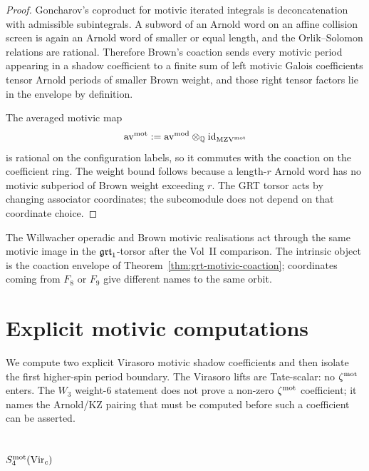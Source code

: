 \begin{proof}
Goncharov's coproduct for motivic iterated integrals is deconcatenation
with admissible subintegrals. A subword of an Arnold word on an affine
collision screen is again an Arnold word of smaller or equal length,
and the Orlik--Solomon relations are rational. Therefore Brown's
coaction sends every motivic period appearing in a shadow coefficient
to a finite sum of left motivic Galois coefficients tensor Arnold
periods of smaller Brown weight, and those right tensor factors lie in
the envelope by definition.

The averaged motivic map
\[
 \mathrm{av}^{\mathrm{mot}}:=\mathrm{av}^{\mathrm{mod}}\otimes_{\mathbb Q}
 \mathrm{id}_{\mathrm{MZV}^{\mathrm{mot}}}
\]
is rational on the configuration labels, so it commutes with the
coaction on the coefficient ring. The weight bound follows because a
length-$r$ Arnold word has no motivic subperiod of Brown weight
exceeding $r$. The GRT torsor acts by changing associator coordinates;
the subcomodule does not depend on that coordinate choice.
\end{proof}

\begin{remark}
The Willwacher operadic and Brown motivic realisations act through the
same motivic image in the $\mathfrak{grt}_1$-torsor after the Vol~II comparison.
The intrinsic object is the coaction envelope of
Theorem~\ref{thm:grt-motivic-coaction}; coordinates coming from $F_8$
or $F_9$ give different names to the same orbit.
\end{remark}

\section{Explicit motivic computations}
\label{sec:motivic-shadow-explicit-computations}

We compute two explicit Virasoro motivic shadow coefficients and then
isolate the first higher-spin period boundary. The Virasoro lifts are
Tate-scalar: no $\zeta^{\mathrm{mot}}$ enters. The $W_3$ weight-$6$ statement
does not prove a non-zero $\zeta^{\mathrm{mot}}$ coefficient; it names the
Arnold/KZ pairing that must be computed before such a coefficient can
be asserted.

\subsection{$S_4^{\mathrm{mot}}(\mathrm{Vir}_c)$}


